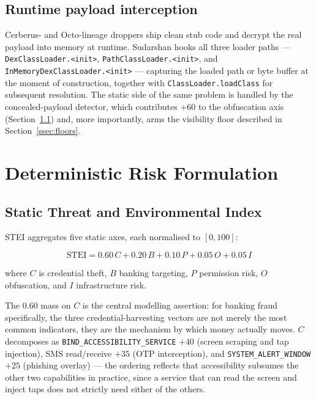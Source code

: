 \documentclass{article}
\begin{document}
\subsection{Runtime payload interception}
\label{ssec:dex}

Cerberus- and Octo-lineage droppers ship clean stub code and decrypt the real
payload into memory at runtime. Sudarshan hooks all three loader paths ---
\texttt{DexClassLoader.<init>}, \texttt{PathClassLoader.<init>}, and
\texttt{InMemoryDexClassLoader.<init>} --- capturing the loaded path or byte
buffer at the moment of construction, together with
\texttt{ClassLoader.loadClass} for subsequent resolution. The static side of the
same problem is handled by the concealed-payload detector, which contributes
$+60$ to the obfuscation axis (Section~\ref{ssec:stei}) and, more importantly,
arms the visibility floor described in Section~\ref{ssec:floors}.

\section{Deterministic Risk Formulation}
\label{sec:math}

\subsection{Static Threat and Environmental Index}
\label{ssec:stei}

STEI aggregates five static axes, each normalised to $[0,100]$:

\begin{equation}
\mathrm{STEI} = 0.60\,C + 0.20\,B + 0.10\,P + 0.05\,O + 0.05\,I
\label{eq:stei}
\end{equation}

where $C$ is credential theft, $B$ banking targeting, $P$ permission risk, $O$
obfuscation, and $I$ infrastructure risk.

The 0.60 mass on $C$ is the central modelling assertion: for banking fraud
specifically, the three credential-harvesting vectors are not merely the most
common indicators, they are the mechanism by which money actually moves. $C$
decomposes as \texttt{BIND\_ACCESSIBILITY\_SERVICE} $+40$ (screen scraping and
tap injection), SMS read/receive $+35$ (OTP interception), and
\texttt{SYSTEM\_ALERT\_WINDOW} $+25$ (phishing overlay) --- the ordering
reflects that accessibility subsumes the other two capabilities in practice,
since a service that can read the screen and inject taps does not strictly need
either of the others.
\end{document}
